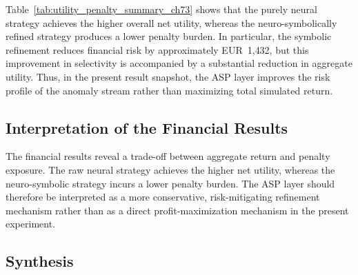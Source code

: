 
\begin{table}[H]
	\centering
	\caption{Utility and penalty summary for raw neural and neuro-symbolically refined anomaly signals. The neuro-symbolic net utility is taken from the existing 2022 financial backtest.}
	\label{tab:utility_penalty_summary_ch73}
	\small %
\end{table}

Table~\ref{tab:utility_penalty_summary_ch73} shows that the purely neural strategy achieves the higher overall net utility, whereas the neuro-symbolically refined strategy produces a lower penalty burden. In particular, the symbolic refinement reduces financial risk by approximately EUR~1{,}432, but this improvement in selectivity is accompanied by a substantial reduction in aggregate utility. Thus, in the present result snapshot, the ASP layer improves the risk profile of the anomaly stream rather than maximizing total simulated return.

\subsection{Interpretation of the Financial Results}

The financial results reveal a trade-off between aggregate return and penalty
exposure. The raw neural strategy achieves the higher net utility, whereas the
neuro-symbolic strategy incurs a lower penalty burden. The ASP layer should
therefore be interpreted as a more conservative, risk-mitigating refinement
mechanism rather than as a direct profit-maximization mechanism in the present
experiment.

\subsection{Synthesis}

